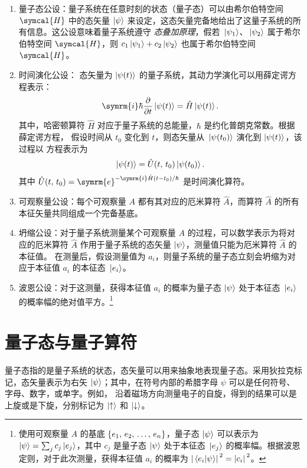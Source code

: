 \documentclass[type=doctor]{fduthesis}
\newcommand{\hilbertH}{\symcal{H}}
\newcommand{\ee}{\symrm{e}}
\newcommand{\ii}{\symrm{i}}
\begin{document}
\begin{enumerate}
  \item 量子态公设：量子系统在任意时刻的状态（量子态）可以由希尔伯特空间 $\hilbertH$ 中的态矢量
    $\ket{\psi}$ 来设定，这态矢量完备地给出了这量子系统的所有信息。这公设意味着量子系统遵守%
    \emph{态叠加原理}，假若 $\ket*{\psi_1}$、$\ket*{\psi_2}$ 属于希尔伯特空间 $\hilbertH$，则
    $c_1\ket*{\psi_1} + c_2\ket*{\psi_2}$ 也属于希尔伯特空间 $\hilbertH$。
  \item 时间演化公设： 态矢量为 $\ket{\psi(t)}$ 的量子系统，其动力学演化可以用薛定谔方程表示：
    \begin{equation}
      \ii\hbar \pdv{t} \ket{\psi(t)} = \hat{H} \ket{\psi(t)}.
    \end{equation}
    其中，哈密顿算符 $\hat{H}$ 对应于量子系统的总能量，$\hbar$ 是约化普朗克常数。根据薛定谔方程，
    假设时间从 $t_0$ 变化到 $t$，则态矢量从 $\ket*{\psi(t_0)}$ 演化到 $\ket{\psi(t)}$，该过程以
    方程表示为
    \begin{equation}
      \ket{\psi(t)} = \hat{U}(t,\,t_0) \ket*{\psi(t_0)}.
    \end{equation}
    其中 $\hat{U}(t,\,t_0) = \ee^{-\ii\hat{H}(t-t_0) / \hbar}$ 是时间演化算符。
  \item 可观察量公设：每个可观察量 $A$ 都有其对应的厄米算符 $\hat{A}$，而算符 $\hat{A}$ 的所有
    本征矢量共同组成一个完备基底。
  \item 坍缩公设：对于量子系统测量某个可观察量 $A$ 的过程，可以数学表示为将对应的厄米算符
    $\hat{A}$ 作用于量子系统的态矢量 $\ket{\psi}$，测量值只能为厄米算符 $\hat{A}$ 的本征值。
    在测量后，假设测量值为 $a_i$，则量子系统的量子态立刻会坍缩为对应于本征值 $a_i$ 的本征态
    $\ket*{e_i}$。
  \item 波恩公设：对于这测量，获得本征值 $a_i$ 的概率为量子态 $\ket{\psi}$ 处于本征态 $\ket*{e_i}$
    的概率幅的绝对值平方。\footnote{%
      使用可观察量 $A$ 的基底 $\qty{e_1,\,e_2,\,\ldots,\,e_n}$，量子态 $\ket{\psi}$ 可以表示为
      $\ket{\psi} = \sum_j c_j \ket*{e_j}$，其中 $c_j$ 是量子态 $\ket{\psi}$ 处于本征态
      $\ket*{e_j}$ 的概率幅。根据波恩定则，对于此次测量，获得本征值 $a_i$ 的概率为
      $\abs*{\ip*{e_i}{\psi}}^2 = \abs*{c_i}^2$。}
\end{enumerate}

\section{量子态与量子算符}

量子态指的是量子系统的状态，态矢量可以用来抽象地表现量子态。采用狄拉克标记，态矢量表示为右矢
$\ket{\psi}$；其中，在符号内部的希腊字母 $\psi$ 可以是任何符号、字母、数字，或单字。例如，
沿着磁场方向测量电子的自旋，得到的结果可以是上旋或是下旋，分别标记为 $\ket{\uparrow}$ 和
$\ket{\downarrow}$。
\end{document}
